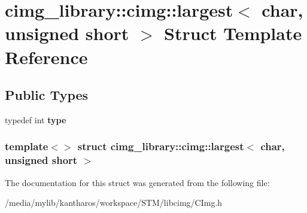 \hypertarget{structcimg__library_1_1cimg_1_1largest_3_01char_00_01unsigned_01short_01_4}{
\section{cimg\_\-library::cimg::largest$<$ char, unsigned short $>$ Struct Template Reference}
\label{structcimg__library_1_1cimg_1_1largest_3_01char_00_01unsigned_01short_01_4}
}
\subsection*{Public Types}
\begin{DoxyCompactItemize}
\item 
\hypertarget{structcimg__library_1_1cimg_1_1largest_3_01char_00_01unsigned_01short_01_4_af7ee1e1661b92f970b082a0f1e6e2569}{
typedef int {\bfseries type}}
\label{structcimg__library_1_1cimg_1_1largest_3_01char_00_01unsigned_01short_01_4_af7ee1e1661b92f970b082a0f1e6e2569}

\end{DoxyCompactItemize}
\subsubsection*{template$<$$>$ struct cimg\_\-library::cimg::largest$<$ char, unsigned short $>$}



The documentation for this struct was generated from the following file:\begin{DoxyCompactItemize}
\item 
/media/mylib/kantharos/workspace/STM/libcimg/CImg.h\end{DoxyCompactItemize}
